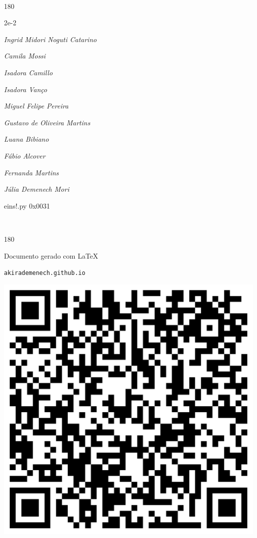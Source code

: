 \documentclass[12pt]{article}
\begin{document}
	\ 
	\vfill
	\begin{turn}{180}	
		\begin{minipage}{\textwidth}
		  	\ttfamily %
			\centering
			{\Huge 2e-2}
		  
			\hfill
		  
			

\textit{\small Ingrid Midori Noguti Catarino}

\textit{\small Camila Mossi}

\textit{\small Isadora Camillo}

\textit{\small Isadora Vanço}

\textit{\small Miguel Felipe Pereira}

\textit{\small Gustavo de Oliveira Martins}

\textit{\small Luana Bibiano}

\textit{\small Fábio Alcover}

\textit{\small Fernanda Martins}

\textit{\small Júlia Demenech Mori}

\bigskip

eins!.py
0x0031


		\end{minipage}	
	\end{turn}
	\vfill
	\

\pagebreak

	\begin{turn}{180}	
		\begin{minipage}{\textwidth}		  
		  Documento gerado com \LaTeX			
		  
		  \texttt{akirademenech.github.io}

		  \includegraphics[height=0.3\textheight]{2e-2.pdf}

		\end{minipage}	
	\end{turn}  
		  
\end{document}
